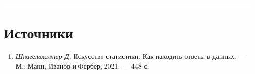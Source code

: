 \documentclass[11pt,a4paper]{article}
\providecommand{\tightlist}{%
      \setlength{\itemsep}{0pt}\setlength{\parskip}{0pt}}
\begin{document}
    \begin{center}\rule{0.5\linewidth}{0.5pt}\end{center}

%
%
%
%

    \hypertarget{ux438ux441ux442ux43eux447ux43dux438ux43aux438}{%
\section{Источники}\label{ux438ux441ux442ux43eux447ux43dux438ux43aux438}}

\begin{enumerate}
\def\labelenumi{\arabic{enumi}.}
\tightlist
\item
  \emph{Шпигельхалтер Д.} Искусство статистики. Как находить ответы в
  данных. --- М.: Манн, Иванов и Фербер, 2021. --- 448 с.
\end{enumerate}
\end{document}
